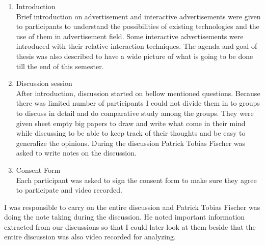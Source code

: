 \begin{enumerate}
\item Introduction \\
Brief introduction on advertisement and interactive advertisements were given to participants to understand the possibilities of existing technologies and the use of them in advertisement field. Some interactive advertisements were introduced with their relative interaction techniques. The agenda and goal of thesis was also described to have a wide picture of what is going to be done till the end of this semester.


\item Discussion session \\
After introduction, discussion started on bellow mentioned questions. Because there was limited number of participants I could not divide them in to groups to discuss in detail and do comparative study among the groups. They were given sheet empty big papers to draw and write what come in their mind while discussing to be able to keep track of their thoughts and be easy to generalize the opinions. During the discussion Patrick Tobias Fischer was asked to write notes on the discussion.

\item Consent Form \\
Each participant was asked to sign the consent form to make sure they agree to participate and video recorded.

\end{enumerate}


I was responsible to carry on the entire discussion and Patrick Tobias Fischer was doing the note taking during the discussion. He noted important information extracted from our discussions so that I could later look at them beside that the entire discussion was also video recorded for analyzing.


